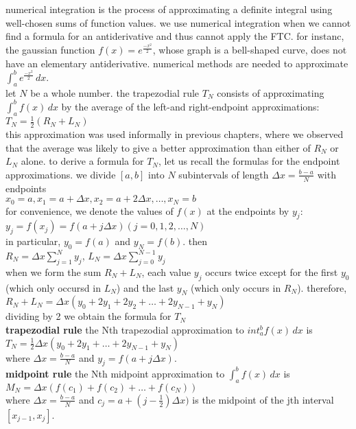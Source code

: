 \documentclass{article}
\begin{document}
numerical integration is the process of approximating a definite integral using well-chosen sums of function values. we use numerical integration when we cannot find a formula for an antiderivative and thus cannot apply the FTC. for instanc, the gaussian function $f(x) = e^{\frac{-x^2}{2}}$, whose graph is a bell-shaped curve, does not have an elementary antiderivative. numerical methods are needed to approximate $\int_{a}^{b}e^{\frac{-x^2}{2}}\,dx$.\\ let $N$ be a whole number. the trapezodial rule $T_N$ consists of approximating $\int_{a}^{b}f(x)\,dx$ by the average of the left-and right-endpoint approximations: $T_N = \frac{1}{2}(R_N + L_N)$\\ this approximation was used informally in previous chapters, where we observed that the average was likely to give a better approximation than either of $R_N$ or $L_N$ alone. to derive a formula for $T_N$, let us recall the formulas for the endpoint approximations. we divide $[a, b]$ into $N$ subintervals of length $\Delta x = \frac{b - a}{N}$ with endpoints\\ $x_0 = a, x_1 = a + \Delta x, x_2 = a + 2\Delta x, \ldots, x_N = b$\\ for convenience, we denote the values of $f(x)$ at the endpoints by $y_j$:\\ $y_j = f(x_j) = f(a + j\Delta x) (j = 0, 1, 2, \ldots, N)$\\ in particular, $y_0 = f(a)$ and $y_N = f(b)$. then\\$R_N = \Delta x\sum_{j=1}^{N}y_j$, $L_N = \Delta x\sum_{j=0}^{N-1}y_j$\\ when we form the sum $R_N + L_N$, each value $y_j$ occurs twice except for the first $y_0$ (which only occursd in $L_N$) and the last $y_N$ (which only occurs in $R_N$). therefore,\\ $R_N + L_N = \Delta x(y_0 + 2y_1 + 2y_2 + \ldots + 2y_{N-1} + y_N)$\\ dividing by 2 we obtain the formula for $T_N$\\

\textbf{trapezodial rule} the Nth trapezodial approximation to $int_{a}^{b}f(x)\,dx$ is\\
$T_N = \frac{1}{2}\Delta x(y_0 + 2y_1 + \ldots + 2y_{N-1} + y_N)$\\
where $\Delta x = \frac{b - a}{N}$ and $y_j = f(a + j\Delta x)$.\\

\textbf{midpoint rule} the Nth midpoint approximation to $\int_{a}^{b}f(x)\,dx$ is\\
$M_N = \Delta x(f(c_1) + f(c_2) + \ldots + f(c_N))$\\
where $\Delta x = \frac{b - a}{N}$ and $c_j = a + (j - \frac{1}{2})\Delta x)$ is the midpoint of the jth interval $[x_{j-1}, x_j]$.\\
\end{document}
